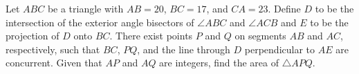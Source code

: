 Let $ABC$ be a triangle with $AB=20$, $BC=17$, and $CA=23$. Define $D$ to be the intersection of the exterior angle bisectors of $\angle{ABC}$ and $\angle{ACB}$ and $E$ to be the projection of $D$ onto $BC$. There exist points $P$ and $Q$ on segments $AB$ and $AC$, respectively, such that $BC$, $PQ$, and the line through $D$ perpendicular to $AE$ are concurrent. Given that $AP$ and $AQ$ are integers, find the area of $\triangle{APQ}$.